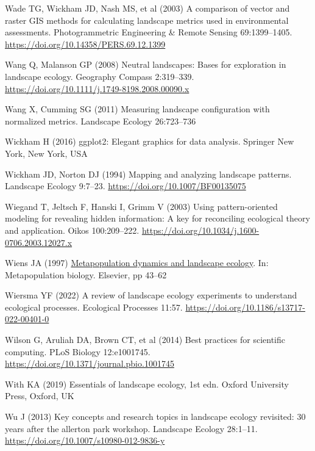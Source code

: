 \documentclass[
  10pt,
  a4paperpaper,
]{article}
\newlength{\cslhangindent}
\newenvironment{CSLReferences}[2] %
 {\begin{list}{}{%
  \setlength{\itemindent}{0pt}
  \setlength{\leftmargin}{0pt}
  \setlength{\parsep}{0pt}
  \ifodd #1
   \setlength{\leftmargin}{\cslhangindent}
   \setlength{\itemindent}{-1\cslhangindent}
  \fi
  \setlength{\itemsep}{#2\baselineskip}}}
 {\end{list}}
\begin{document}
\begin{CSLReferences}{1}{1}
Wade TG, Wickham JD, Nash MS, et al (2003) A comparison of vector and
raster GIS methods for calculating landscape metrics used in
environmental assessments. Photogrammetric Engineering \& Remote Sensing
69:1399--1405. \url{https://doi.org/10.14358/PERS.69.12.1399}

Wang Q, Malanson GP (2008) Neutral landscapes: Bases for exploration in
landscape ecology. Geography Compass 2:319--339.
\url{https://doi.org/10.1111/j.1749-8198.2008.00090.x}

Wang X, Cumming SG (2011) Measuring landscape configuration with
normalized metrics. Landscape Ecology 26:723--736

Wickham H (2016) ggplot2: Elegant graphics for data analysis. Springer
New York, New York, USA

Wickham JD, Norton DJ (1994) Mapping and analyzing landscape patterns.
Landscape Ecology 9:7--23. \url{https://doi.org/10.1007/BF00135075}

Wiegand T, Jeltsch F, Hanski I, Grimm V (2003) Using pattern-oriented
modeling for revealing hidden information: A key for reconciling
ecological theory and application. Oikos 100:209--222.
\url{https://doi.org/10.1034/j.1600-0706.2003.12027.x}

Wiens JA (1997)
\href{https://doi.org/10.1016/B978-012323445-2/50005-5}{Metapopulation
dynamics and landscape ecology}. In: Metapopulation biology. Elsevier,
pp 43--62

Wiersma YF (2022) A review of landscape ecology experiments to
understand ecological processes. Ecological Processes 11:57.
\url{https://doi.org/10.1186/s13717-022-00401-0}

Wilson G, Aruliah DA, Brown CT, et al (2014) Best practices for
scientific computing. PLoS Biology 12:e1001745.
\url{https://doi.org/10.1371/journal.pbio.1001745}

With KA (2019) Essentials of landscape ecology, 1st edn. Oxford
University Press, Oxford, UK

Wu J (2013) Key concepts and research topics in landscape ecology
revisited: 30 years after the allerton park workshop. Landscape Ecology
28:1--11. \url{https://doi.org/10.1007/s10980-012-9836-y}


\end{CSLReferences}
\end{document}
